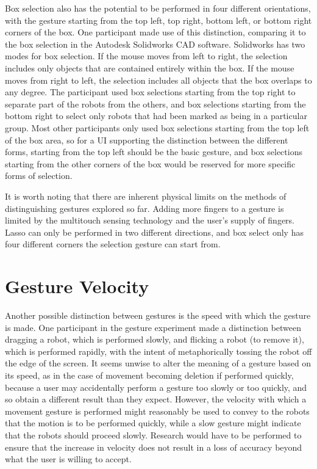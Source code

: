 Box selection also has the potential to be performed in four different orientations, with the gesture starting from the top left, top right, bottom left, or bottom right corners of the box. 
One participant made use of this distinction, comparing it to the box selection in the Autodesk Solidworks CAD software. 
Solidworks has two modes for box selection. 
If the mouse moves from left to right, the selection includes only objects that are contained entirely within the box. 
If the mouse moves from right to left, the selection includes all objects that the box overlaps to any degree. 
The participant used box selections starting from the top right to separate part of the robots from the others, and box selections starting from the bottom right to select only robots that had been marked as being in a particular group. 
Most other participants only used box selections starting from the top left of the box area, so for a UI supporting the distinction between the different forms, starting from the top left should be the basic gesture, and box selections starting from the other corners of the box would be reserved for more specific forms of selection. 

It is worth noting that there are inherent physical limits on the methods of distinguishing gestures explored so far. Adding more fingers to a gesture is limited by the multitouch sensing technology and the user's supply of fingers. 
Lasso can only be performed in two different directions, and box select only has four different corners the selection gesture can start from. 

\section{Gesture Velocity}

Another possible distinction between gestures is the speed with which the gesture is made. 
One participant in the gesture experiment made a distinction between dragging a robot, which is performed slowly, and flicking a robot (to remove it), which is performed rapidly, with the intent of metaphorically tossing the robot off the edge of the screen. 
It seems unwise to alter the meaning of a gesture based on its speed, as in the case of movement becoming deletion if performed quickly, because a user may accidentally perform a gesture too slowly or too quickly, and so obtain a different result than they expect. 
However, the velocity with which a movement gesture is performed might reasonably be used to convey to the robots that the motion is to be performed quickly, while a slow gesture might indicate that the robots should proceed slowly.
Research would have to be performed to ensure that the increase in velocity does not result in a loss of accuracy beyond what the user is willing to accept.
  
